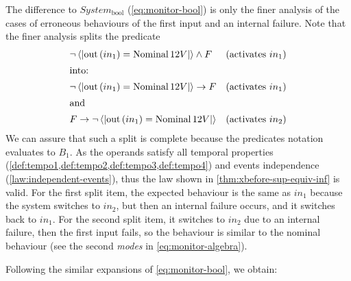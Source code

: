 \begin{sloppypar}
The difference to $System_{\mathrm{bool}}$ (\cref{eq:monitor-bool}) is only the finer analysis of the cases of erroneous behaviours of the first input and an internal failure.
Note that the finer analysis splits the predicate 
%
\begin{align*}
  & \lnot \left\langle\left| \mathrm{out}\left(in_1\right) = \mathop{\mathrm{Nominal}} 12V \right|\right\rangle \land F & \text{(activates } in_1\text{)}\\
  \intertext{into:}
  & \lnot\left\langle\left| \mathrm{out}\left(in_1\right) = \mathop{\mathrm{Nominal}} 12V \right|\right\rangle \rightarrow F & \text{(activates } in_1\text{)}\\
  \intertext{and}
  & F \rightarrow \lnot\left\langle\left| \mathrm{out}\left(in_1\right) = \mathop{\mathrm{Nominal}} 12V \right|\right\rangle & \text{(activates } in_2\text{)}
\end{align*}
%
We can assure that such a split is complete because the predicates notation evaluates to $B_1$. 
As the operands satisfy all temporal properties (\cref{def:tempo1,def:tempo2,def:tempo3,def:tempo4}) and events independence (\cref{law:independent-events}), thus the law shown in \cref{thm:xbefore-sup-equiv-inf} is valid.
For the first split item, the expected behaviour is the same as $in_1$ because the system switches to $in_2$, but then an internal failure occurs, and it switches back to $in_1$.
For the second split item, it switches to $in_2$ due to an internal failure, then the first input fails, so the behaviour is similar to the nominal behaviour (see the second \emph{modes} in \cref{eq:monitor-algebra}).
\end{sloppypar}
%
Following the similar expansions of \cref{eq:monitor-bool}, we obtain:
%
